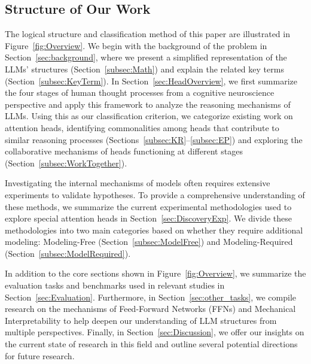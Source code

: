 \documentclass{article}
\begin{document}
\subsection{Structure of Our Work}
The logical structure and classification method of this paper are illustrated in Figure~\ref{fig:Overview}. We begin with the background of the problem in Section~\ref{sec:background}, where we present a simplified representation of the LLMs' structures (Section~\ref{subsec:Math}) and explain the related key terms (Section~\ref{subsec:KeyTerm}). In Section~\ref{sec:HeadOverview}, we first summarize the four stages of human thought processes from a cognitive neuroscience perspective and apply this framework to analyze the reasoning mechanisms of LLMs. Using this as our classification criterion, we categorize existing work on attention heads, identifying commonalities among heads that contribute to similar reasoning processes (Sections~\ref{subsec:KR}–\ref{subsec:EP}) and exploring the collaborative mechanisms of heads functioning at different stages (Section~\ref{subsec:WorkTogether}).

Investigating the internal mechanisms of models often requires extensive experiments to validate hypotheses. To provide a comprehensive understanding of these methods, we summarize the current experimental methodologies used to explore special attention heads in Section~\ref{sec:DiscoveryExp}. We divide these methodologies into two main categories based on whether they require additional modeling: Modeling-Free (Section~\ref{subsec:ModelFree}) and Modeling-Required (Section~\ref{subsec:ModelRequired}).

In addition to the core sections shown in Figure~\ref{fig:Overview}, we summarize the evaluation tasks and benchmarks used in relevant studies in Section~\ref{sec:Evaluation}.
Furthermore, in Section~\ref{sec:other_tasks}, we compile research on the mechanisms of Feed-Forward Networks (FFNs) and Mechanical Interpretability to help deepen our understanding of LLM structures from multiple perspectives.
Finally, in Section~\ref{sec:Discussion}, we offer our insights on the current state of research in this field and outline several potential directions for future research.
\end{document}
